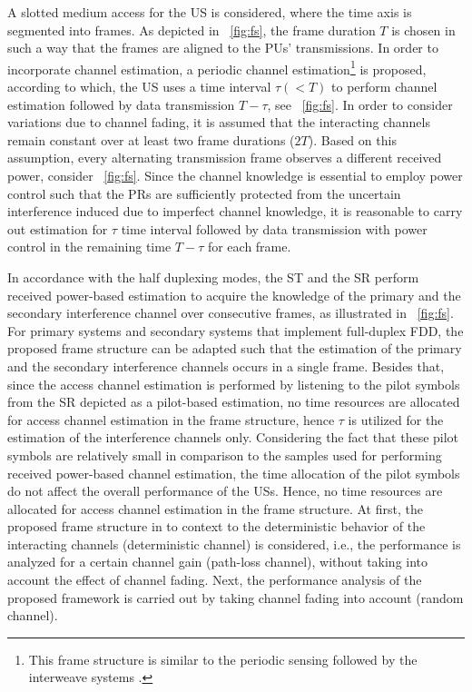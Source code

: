 A slotted medium access for the US is considered, where the time axis is segmented into frames. As depicted in \figurename~\ref{fig:fs}, the frame duration $T$ is chosen in such a way that the frames are aligned to the PUs' transmissions. In order to incorporate channel estimation, a periodic channel estimation\footnote{This frame structure is similar to the periodic sensing followed by the interweave systems \cite{Liang08}.} is proposed, according to which, the US uses a time interval $\tau (< T)$ to perform channel estimation followed by data transmission $T- \tau$, see \figurename~\ref{fig:fs}. In order to consider variations due to channel fading, it is assumed that the interacting channels remain constant over at least two frame durations ($2T$). Based on this assumption, every alternating transmission frame observes a different received power, consider \figurename~\ref{fig:fs}. Since the channel knowledge is essential to employ power control such that the PRs are sufficiently protected from the uncertain interference induced due to imperfect channel knowledge, it is reasonable to carry out estimation for $\tau$ time interval followed by data transmission with power control in the remaining time $T - \tau$ for each frame. %

In accordance with the half duplexing modes, the ST and the SR perform received power-based estimation to acquire the knowledge of the primary and the secondary interference channel over consecutive frames, as illustrated in \figurename~\ref{fig:fs}. For primary systems and secondary systems that implement full-duplex FDD, the proposed frame structure can be adapted such that the estimation of the primary and the secondary interference channels occurs in a single frame. Besides that, since the access channel estimation is performed by listening to the pilot symbols from the SR depicted as a pilot-based estimation, no time resources are allocated for access channel estimation in the frame structure, hence $\tau$ is utilized for the estimation of the interference channels only. 
Considering the fact that these pilot symbols are relatively small in comparison to the samples used for performing received power-based channel estimation, the time allocation of the pilot symbols do not affect the overall performance of the USs. Hence, no time resources are allocated for access channel estimation in the frame structure.
At first, the proposed frame structure in to context to the deterministic behavior of the interacting channels (deterministic channel) is considered, i.e., the performance is analyzed for a certain channel gain (path-loss channel), without taking into account the effect of channel fading. Next, the performance analysis of the proposed framework is carried out by taking channel fading into account (random channel). %



